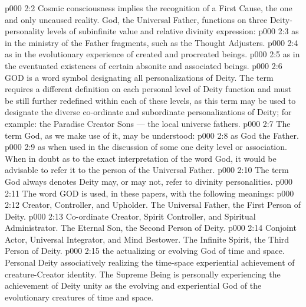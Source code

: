 \vs p000 2:2 Cosmic consciousness implies the recognition of a First Cause, the one and only uncaused reality. God, the Universal Father, functions on three Deity\hyp{}personality levels of subinfinite value and relative divinity expression:
\vs p000 2:3 \bibnobreakspace {} as in the ministry of the Father fragments, such as the Thought Adjusters.
\vs p000 2:4 \bibnobreakspace {} as in the evolutionary experience of created and procreated beings.
\vs p000 2:5 \bibnobreakspace {} as in the eventuated existences of certain absonite and associated beings.
\vs p000 2:6 GOD is a word symbol designating all personalizations of Deity. The term requires a different definition on each personal level of Deity function and must be still further redefined within each of these levels, as this term may be used to designate the diverse co\hyp{}ordinate and subordinate personalizations of Deity; for example: the Paradise Creator Sons --- the local universe fathers.
\vs p000 2:7 \pc The term God, as we make use of it, may be understood:
\vs p000 2:8  as God the Father.
\vs p000 2:9  as when used in the discussion of some one deity level or association. When in doubt as to the exact interpretation of the word God, it would be advisable to refer it to the person of the Universal Father.
\vs p000 2:10 \pc The term God always denotes  Deity may, or may not, refer to divinity personalities.
\vs p000 2:11 \pc The word GOD is used, in these papers, with the following meanings:
\vs p000 2:12 \bibnobreakspace {} Creator, Controller, and Upholder. The Universal Father, the First Person of Deity.
\vs p000 2:13 \bibnobreakspace {} Co\hyp{}ordinate Creator, Spirit Controller, and Spiritual Administrator. The Eternal Son, the Second Person of Deity.
\vs p000 2:14 \bibnobreakspace {} Conjoint Actor, Universal Integrator, and Mind Bestower. The Infinite Spirit, the Third Person of Deity.
\vs p000 2:15 \bibnobreakspace {} the actualizing or evolving God of time and space. Personal Deity associatively realizing the time\hyp{}space experiential achievement of creature\hyp{}Creator identity. The Supreme Being is personally experiencing the achievement of Deity unity as the evolving and experiential God of the evolutionary creatures of time and space.
